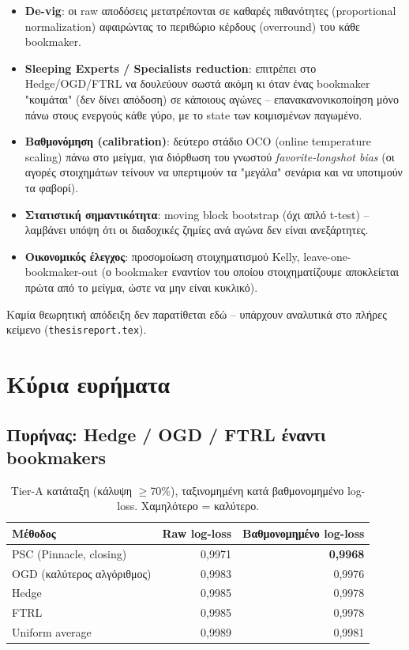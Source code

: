 \documentclass[11pt,a4paper]{article}
\newcommand{\file}[1]{\texttt{#1}}
\renewcommand{\_}{\oldunderscore\allowbreak}
\begin{document}
\begin{itemize}
  \item \textbf{De-vig}: οι raw αποδόσεις μετατρέπονται σε καθαρές πιθανότητες
        (proportional normalization) αφαιρώντας το περιθώριο κέρδους (overround) του
        κάθε bookmaker.
  \item \textbf{Sleeping Experts / Specialists reduction}: επιτρέπει στο Hedge/OGD/FTRL να
        δουλεύουν σωστά ακόμη κι όταν ένας bookmaker "κοιμάται" (δεν δίνει απόδοση) σε
        κάποιους αγώνες -- επανακανονικοποίηση μόνο πάνω στους ενεργούς κάθε γύρο, με το
        state των κοιμισμένων παγωμένο.
  \item \textbf{Βαθμονόμηση (calibration)}: δεύτερο στάδιο OCO (online temperature scaling)
        πάνω στο μείγμα, για διόρθωση του γνωστού \emph{favorite-longshot bias} (οι αγορές
        στοιχημάτων τείνουν να υπερτιμούν τα "μεγάλα" σενάρια και να υποτιμούν τα φαβορί).
  \item \textbf{Στατιστική σημαντικότητα}: moving block bootstrap (όχι απλό t-test) --
        λαμβάνει υπόψη ότι οι διαδοχικές ζημίες ανά αγώνα δεν είναι ανεξάρτητες.
  \item \textbf{Οικονομικός έλεγχος}: προσομοίωση στοιχηματισμού Kelly, leave-one-
        bookmaker-out (ο bookmaker εναντίον του οποίου στοιχηματίζουμε αποκλείεται πρώτα
        από το μείγμα, ώστε να μην είναι κυκλικό).
\end{itemize}

Καμία θεωρητική απόδειξη δεν παρατίθεται εδώ -- υπάρχουν αναλυτικά στο πλήρες κείμενο
(\file{thesis\_report.tex}).

\section{Κύρια ευρήματα}

\subsection{Πυρήνας: Hedge / OGD / FTRL έναντι bookmakers}

\begin{table}[h]
\centering
\begin{tabular}{@{}lrr@{}}
\toprule
\textbf{Μέθοδος} & \textbf{Raw log-loss} & \textbf{Βαθμονομημένο log-loss} \\
\midrule
PSC (Pinnacle, closing) & 0,9971 & \textbf{0,9968} \\
OGD (καλύτερος αλγόριθμος) & 0,9983 & 0,9976 \\
Hedge & 0,9985 & 0,9978 \\
FTRL & 0,9985 & 0,9978 \\
Uniform average & 0,9989 & 0,9981 \\
\bottomrule
\end{tabular}
\caption{Tier-A κατάταξη (κάλυψη $\geq$70\%), ταξινομημένη κατά βαθμονομημένο log-loss.
Χαμηλότερο = καλύτερο.}
\end{table}
\end{document}

